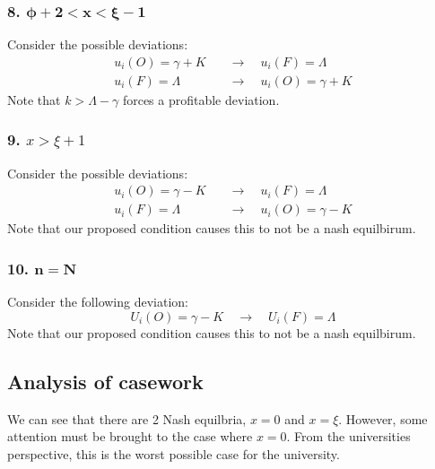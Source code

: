 \documentclass[12pt]{article}
\begin{document}
\subsubsection*{8. $\mathbf{\phi + 2 < x < \xi -1}$}
Consider the possible deviations:
\begin{align*}
    u_i(O) = \gamma + K \quad &\to \quad u_i(F) = \Lambda\\
    u_i(F) = \Lambda \quad &\to \quad u_i(O) = \gamma + K
\end{align*}
Note that $k > \Lambda - \gamma$ forces a profitable deviation. 
\subsubsection*{9. $x > \xi + 1$}
Consider the possible deviations:
\begin{align*}
    u_i(O) = \gamma - K \quad &\to \quad u_i(F) = \Lambda  \\
    u_i(F) = \Lambda \quad &\to \quad u_i(O) = \gamma - K
\end{align*}
Note that our proposed condition causes this to not be a nash equilbirum. 
\subsubsection*{10. $\mathbf{n = N}$}
Consider the following deviation:
\[
U_i(O) = \gamma - K \quad \to \quad  U_i(F) = \Lambda 
\]
Note that our proposed condition causes this to not be a nash equilbirum. 
\subsection{Analysis of casework}
We can see that there are 2 Nash equilbria, $x = 0$ and $x = \xi$. However, some attention must be brought to the case where $x = 0$. From the universities perspective, this is the worst possible case for the university. 
\end{document}
